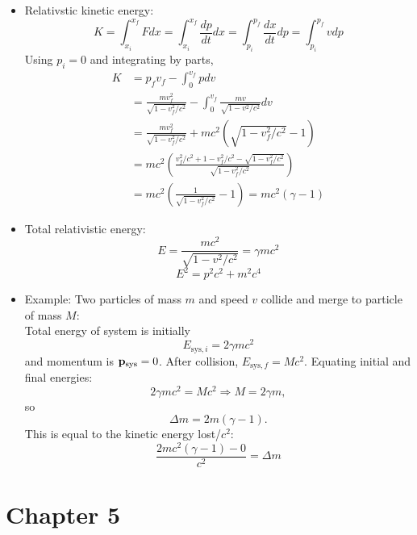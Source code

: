 \documentclass[12pt]{article}
\begin{document}
\begin{itemize}
\item Relativstic kinetic energy:
\begin{equation}
K = \int_{x_i}^{x_f} F dx = \int_{x_i}^{x_f}\frac{dp}{dt}dx =  \int_{p_i}^{p_f}\frac{dx}{dt}{dp} = \int_{p_i}^{p_f} v dp
\end{equation}
Using $p_i = 0$ and integrating by parts, 
\begin{align}
K &= p_fv_f - \int_0^{v_f} p dv \\
&= \frac{mv_f^2}{\sqrt{1 - v_f^2/c^2}} - \int_0^{v_f}\frac{m v}{\sqrt{1 - v^2/c^2}}dv \\
&= \frac{mv_f^2}{\sqrt{1 - v_f^2/c^2}} + mc^2\left(\sqrt{1- v_f^2/c^2} - 1\right) \\
&= mc^2\left(\frac{v_f^2/c^2 + 1 - v_f^2/c^2 - \sqrt{1 - v_f^2/c^2}}{\sqrt{1 - v_f^2/c^2}}\right) \\
&= mc^2\left(\frac{1}{\sqrt{1 - v_f^2/c^2}} - 1\right) = mc^2(\gamma - 1)
\end{align}
\item Total relativistic energy:
\begin{equation}
E = \frac{ mc^2}{\sqrt{1 - v^2/c^2}} = \gamma m c^2
\end{equation}
\begin{equation}
E^2 = p^2 c^2 + m^2 c^4
\end{equation}
\item Example: Two particles of mass $m$ and speed $v$ collide and merge to particle of mass $M$:\\
Total energy of system is initially
\begin{equation}
E_{\text{sys},i} = 2\gamma m c^2
\end{equation}
and momentum is ${\bf p}_\text{sys}  =0$. After collision, $E_{\text{sys},f} = M c^2$. Equating initial and final energies:
\begin{equation}
2\gamma m c^2 = M c^2 \Longrightarrow M = 2 \gamma m,
\end{equation}
so \begin{equation}
\Delta m = 2m(\gamma - 1).
\end{equation}
This is equal to the kinetic energy lost/$c^2$:
\begin{equation}
\frac{2 m c^2(\gamma - 1) - 0}{c^2} = \Delta m
\end{equation}

\end{itemize}

\section*{Chapter 5}
\end{document}
